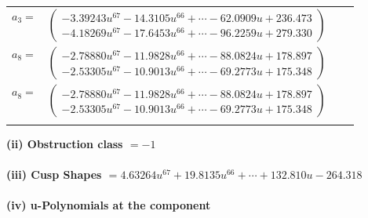 \documentclass[1p]{elsarticle_modified}
\theoremstyle{definition}
\begin{document}
\begin{tabular}{m{7pt} m{180pt} m{7pt} m{180pt} }
\flushright $a_{3}=$&$\begin{pmatrix}-3.39243 u^{67}-14.3105 u^{66}+\cdots-62.0909 u+236.473\\-4.18269 u^{67}-17.6453 u^{66}+\cdots-96.2259 u+279.330\end{pmatrix}$ \\
\flushright $a_{8}=$&$\begin{pmatrix}-2.78880 u^{67}-11.9828 u^{66}+\cdots-88.0824 u+178.897\\-2.53305 u^{67}-10.9013 u^{66}+\cdots-69.2773 u+175.348\end{pmatrix}$\\ \flushright $a_{8}=$&$\begin{pmatrix}-2.78880 u^{67}-11.9828 u^{66}+\cdots-88.0824 u+178.897\\-2.53305 u^{67}-10.9013 u^{66}+\cdots-69.2773 u+175.348\end{pmatrix}$\\&\end{tabular}
\flushleft \textbf{(ii) Obstruction class $= -1$}\\~\\
\flushleft \textbf{(iii) Cusp Shapes $= 4.63264 u^{67}+19.8135 u^{66}+\cdots+132.810 u-264.318$}\\~\\
\newpage\renewcommand{\arraystretch}{1}
\flushleft \textbf{(iv) u-Polynomials at the component}\newline \\
\end{document}
